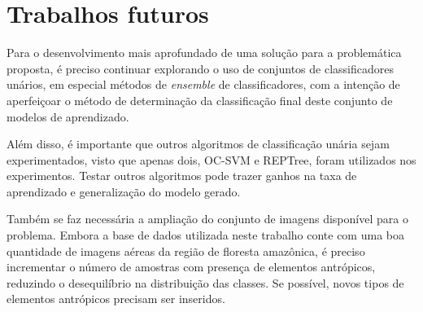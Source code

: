 \section{Trabalhos futuros}

Para o desenvolvimento mais aprofundado de uma solução para a problemática proposta, é preciso continuar explorando o uso de conjuntos de classificadores unários, em especial métodos de \textit{ensemble} de classificadores, com a intenção de aperfeiçoar o método de determinação da classificação final deste conjunto de modelos de aprendizado.

Além disso, é importante que outros algoritmos de classificação unária sejam experimentados, visto que apenas dois, OC-SVM e REPTree, foram utilizados nos experimentos. Testar outros algoritmos pode trazer ganhos na taxa de aprendizado e generalização do modelo gerado.

Também se faz necessária a ampliação do conjunto de imagens disponível para o problema. Embora a base de dados utilizada neste trabalho conte com uma boa quantidade de imagens aéreas da região de floresta amazônica, é preciso incrementar o número de amostras com presença de elementos antrópicos, reduzindo o desequilíbrio na distribuição das classes. Se possível, novos tipos de elementos antrópicos precisam ser inseridos.